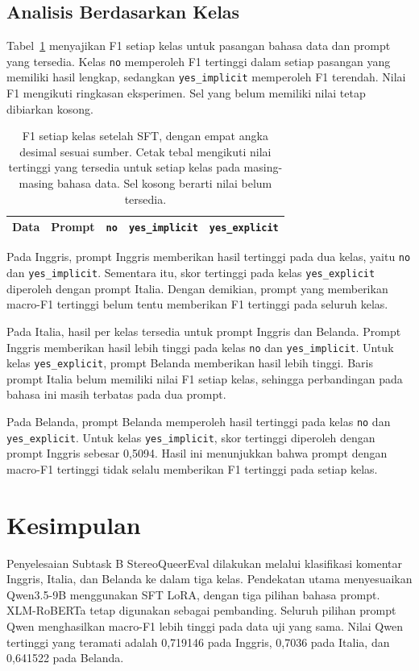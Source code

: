 \documentclass[11pt]{article}
\begin{document}
\subsection{Analisis Berdasarkan Kelas}
Tabel~\ref{tab:classes} menyajikan F1 setiap kelas untuk pasangan bahasa data dan prompt yang tersedia. Kelas \texttt{no} memperoleh F1 tertinggi dalam setiap pasangan yang memiliki hasil lengkap, sedangkan \texttt{yes\_implicit} memperoleh F1 terendah. Nilai F1 mengikuti ringkasan eksperimen. Sel yang belum memiliki nilai tetap dibiarkan kosong.

\begin{table}[t]
\centering
\begin{tabular}{llrrr}
\toprule
Data & Prompt & \texttt{no} & \texttt{yes\_implicit} & \texttt{yes\_explicit} \\
\midrule

\end{tabular}
\caption{F1 setiap kelas setelah SFT, dengan empat angka desimal sesuai sumber. Cetak tebal mengikuti nilai tertinggi yang tersedia untuk setiap kelas pada masing-masing bahasa data. Sel kosong berarti nilai belum tersedia.}
\label{tab:classes}
\end{table}

Pada Inggris, prompt Inggris memberikan hasil tertinggi pada dua kelas, yaitu \texttt{no} dan \nolinkurl{yes_implicit}. Sementara itu, skor tertinggi pada kelas \nolinkurl{yes_explicit} diperoleh dengan prompt Italia. Dengan demikian, prompt yang memberikan macro-F1 tertinggi belum tentu memberikan F1 tertinggi pada seluruh kelas.

Pada Italia, hasil per kelas tersedia untuk prompt Inggris dan Belanda. Prompt Inggris memberikan hasil lebih tinggi pada kelas \texttt{no} dan \texttt{yes\_implicit}. Untuk kelas \texttt{yes\_explicit}, prompt Belanda memberikan hasil lebih tinggi. Baris prompt Italia belum memiliki nilai F1 setiap kelas, sehingga perbandingan pada bahasa ini masih terbatas pada dua prompt.

Pada Belanda, prompt Belanda memperoleh hasil tertinggi pada kelas \texttt{no} dan \texttt{yes\_explicit}. Untuk kelas \texttt{yes\_implicit}, skor tertinggi diperoleh dengan prompt Inggris sebesar 0,5094. Hasil ini menunjukkan bahwa prompt dengan macro-F1 tertinggi tidak selalu memberikan F1 tertinggi pada setiap kelas.

\section{Kesimpulan}
Penyelesaian Subtask B StereoQueerEval dilakukan melalui klasifikasi komentar Inggris, Italia, dan Belanda ke dalam tiga kelas. Pendekatan utama menyesuaikan Qwen3.5-9B menggunakan SFT LoRA, dengan tiga pilihan bahasa prompt. XLM-RoBERTa tetap digunakan sebagai pembanding. Seluruh pilihan prompt Qwen menghasilkan macro-F1 lebih tinggi pada data uji yang sama. Nilai Qwen tertinggi yang teramati adalah 0,719146 pada Inggris, 0,7036 pada Italia, dan 0,641522 pada Belanda.
\end{document}
